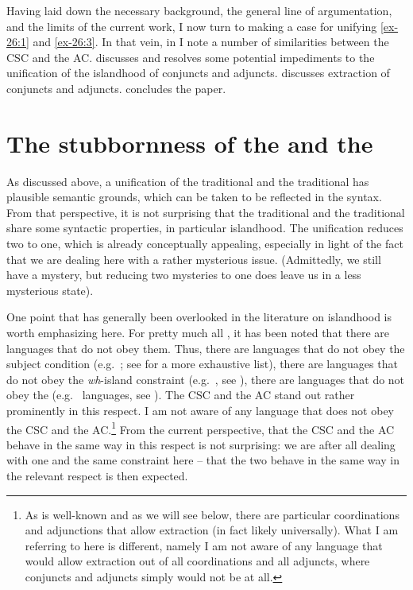 \documentclass[output=paper]{langsci/langscibook}
\begin{document}
Having laid down the necessary background, the general line of argumentation,
and the limits of the current work, I now turn to making a case for unifying
\eqref{ex-26:1} and \eqref{ex-26:3}. In that vein, in 
I note a number of similarities between the \gls{CSC} and the \glsdesc{AC}.  discusses and
resolves some potential impediments to the unification of the
islandhood of conjuncts and adjuncts.
 discusses extraction of conjuncts and adjuncts.
 concludes the paper.

\section{The stubbornness of the  and the
}\label{sec:35.2}

As discussed above, a unification of the traditional  and the
traditional  has plausible semantic grounds, which can be taken to be
reflected in the syntax. From that perspective, it is not surprising that the
traditional  and the traditional  share some syntactic
properties, in particular islandhood. The unification reduces two  to
one, which is already conceptually appealing, especially in light of the fact
that we are dealing here with a rather mysterious issue. (Admittedly, we still
have a mystery, but reducing two mysteries to one does leave us in a less
mysterious state).

One point that has generally been overlooked in the literature on islandhood is
worth emphasizing here. For pretty much all , it has been noted that
there are languages that do not obey them. Thus, there are languages that do
not obey the subject condition (e.g.\ ; see \citealt{Stepanov2001b} for
a more exhaustive list), there are languages that do not obey the
\emph{wh}-island constraint (e.g.\ , see \citealt{Engdahl1986}), there
are languages that do not obey the  (e.g.\ 
languages, see \citealt{Boskovic2015}). The \gls{CSC} and the \gls{AC} stand
out rather prominently in this respect. I am not aware of any language that
does not obey the \gls{CSC} and the \gls{AC}.\footnote{As is well-known and as
    we will see below, there are particular coordinations and adjunctions that
    allow extraction (in fact likely universally). What I am referring to here
    is different, namely I am not aware of any language that would allow
extraction out of all coordinations and all adjuncts, where conjuncts and
adjuncts simply would not be  at all.} From the current perspective,
that the \gls{CSC} and the \gls{AC} behave in the same way in this respect is
not surprising: we are after all dealing with one and the same constraint here
-- that the two behave in the same way in the relevant respect is then
expected.
\end{document}
